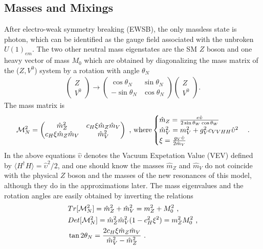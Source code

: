 \subsection*{Masses and Mixings}
After electro-weak symmetry breaking (EWSB), the only massless state is photon, which can be identified as the gauge field associated with the unbroken $U(1)_{em}$. The two other neutral mass eigenstates are the SM $Z$ boson and one heavy vector of mass $M_{0}$ which are obtained by diagonalizing the mass matrix of the ($Z,V^{0}$) system by a rotation with angle $\theta_{N}$
\begin{align}
  \begin{pmatrix}
    Z\\
    V^{0}
  \end{pmatrix}
  \rightarrow
  \begin{pmatrix}
    \cos{\theta_{N}} & \sin{\theta_{N}}\\
    -\sin{\theta_{N}}& \cos{\theta_{N}}
  \end{pmatrix}
  \begin{pmatrix}
    Z\\
    V^{0}
  \end{pmatrix}
  .
\end{align}
The mass matrix is
\begin{align}
  \label{eq:MassMatrixN}
  \mathcal{M}_{N}^{2}=
  \begin{pmatrix}
    \hat{m}_{Z}^{2} & c_{H}\xi \hat{m}_{Z} \hat{m}_{V}\\
    c_{H}\xi \hat{m}_{Z} \hat{m}_{V} & \hat{m}_{V}^{2}
  \end{pmatrix}
  \textup{ , where}
  \begin{cases}
    \hat{m}_{Z}=\frac{e\hat{\upsilon}}{2\sin{\theta_{W}}\cos{\theta_{W}}}\\
    \hat{m}_{V}^{2}=m_{V}^{2}+g_{V}^{2}c_{VVHH}\hat{\upsilon}^{2}\\
    \xi=\frac{g_{V}\hat{\upsilon}}{2\hat{m}_{V}}
  \end{cases}
  .
\end{align}
In the above equations $\hat{\upsilon}$ denotes the Vacuum Expetation Value (VEV) defined by $\big \langle H^{\dagger}H\big \rangle=\hat{\upsilon}^{2}/2$, and one should know the masses $\hat{m}_{Z}$ and $\hat{m}_{V}$ do not coincide with the physical $Z$ boson and the masses of the new resonances of this model, although they do in the approximations later. The mass eigenvalues and the rotation angles are easily obtained by inverting the relations
\begin{align}
  \label{eq:detMN}
  &Tr[\mathcal{M}_{N}^{2}]=\hat{m}_{Z}^{2}+\hat{m}_{V}^{2}=m_{Z}^{2}+M_{0}^{2}\textup{ ,}\nonumber\\
  &Det[\mathcal{M}_{N}^{2}]=\hat{m}_{Z}^{2}\hat{m}_{V}^{2}(1-c_{H}^{2}\xi^{2})=m_{Z}^{2}M_{0}^{2}\textup{ ,}\nonumber\\
  &\tan{2\theta_{N}}=\frac{2c_{H}\xi \hat{m}_{Z} \hat{m}_{V}}{\hat{m}_{V}^{2}-\hat{m}_{Z}^{2}}\textup{ .}
\end{align}
